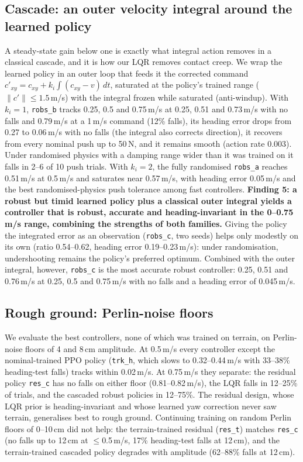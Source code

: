 \documentclass[conference]{IEEEtran}
\theoremstyle{remark}
\newcommand{\finding}[1]{\textbf{#1}}
\begin{document}
\subsection{Cascade: an outer velocity integral around the learned policy}
A steady-state gain below one is exactly what integral action removes in a classical cascade, and it is how our LQR removes contact creep. We wrap the learned policy in an outer loop that feeds it the corrected command $c'_{xy}=c_{xy}+k_i\int(c_{xy}-v)\,dt$, saturated at the policy's trained range ($\lVert c'\rVert\le1.5$\,m/s) with the integral frozen while saturated (anti-windup). With $k_i=1$, \texttt{robs\_b} tracks 0.25, 0.5 and 0.75\,m/s at 0.25, 0.51 and 0.73\,m/s with no falls and 0.79\,m/s at a 1\,m/s command (12\% falls), its heading error drops from 0.27 to 0.06\,m/s with no falls (the integral also corrects direction), it recovers from every nominal push up to 50\,N, and it remains smooth (action rate 0.003). Under randomised physics with a damping range wider than it was trained on it falls in 2--6 of 10 push trials. With $k_i=2$, the fully randomised \texttt{robs\_a} reaches 0.51\,m/s at 0.5\,m/s and saturates near 0.57\,m/s, with heading error 0.05\,m/s and the best randomised-physics push tolerance among fast controllers. \finding{Finding 5: a robust but timid learned policy plus a classical outer integral yields a controller that is robust, accurate and heading-invariant in the 0--0.75\,m/s range, combining the strengths of both families.} Giving the policy the integrated error as an observation (\texttt{robs\_c}, two seeds) helps only modestly on its own (ratio 0.54--0.62, heading error 0.19--0.23\,m/s): under randomisation, undershooting remains the policy's preferred optimum. Combined with the outer integral, however, \texttt{robs\_c} is the most accurate robust controller: 0.25, 0.51 and 0.76\,m/s at 0.25, 0.5 and 0.75\,m/s with no falls and a heading error of 0.045\,m/s.

\subsection{Rough ground: Perlin-noise floors}
We evaluate the best controllers, none of which was trained on terrain, on Perlin-noise floors of 4 and 8\,cm amplitude. At 0.5\,m/s every controller except the nominal-trained PPO policy (\texttt{trk\_h}, which slows to 0.32--0.44\,m/s with 33--38\% heading-test falls) tracks within 0.02\,m/s. At 0.75\,m/s they separate: the residual policy \texttt{res\_c} has no falls on either floor (0.81--0.82\,m/s), the LQR falls in 12--25\% of trials, and the cascaded robust policies in 12--75\%. The residual design, whose LQR prior is heading-invariant and whose learned yaw correction never saw terrain, generalises best to rough ground. Continuing training on random Perlin floors of 0--10\,cm did not help: the terrain-trained residual (\texttt{res\_t}) matches \texttt{res\_c} (no falls up to 12\,cm at $\le$0.5\,m/s, 17\% heading-test falls at 12\,cm), and the terrain-trained cascaded policy degrades with amplitude (62--88\% falls at 12\,cm).
\end{document}
